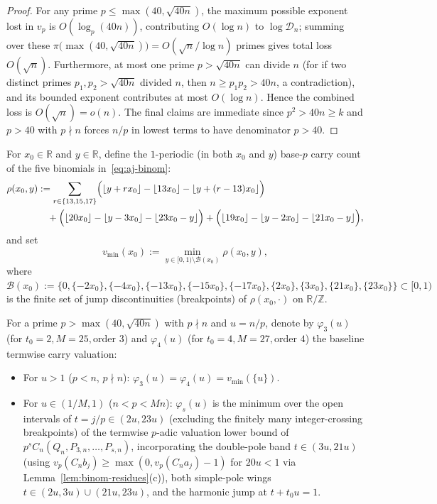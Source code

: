 \documentclass[11pt,reqno]{amsart}
\theoremstyle{definition}
\theoremstyle{remark}
\newcommand{\ZZ}{\mathbb{Z}}
\newcommand{\RR}{\mathbb{R}}
\begin{document}
\begin{proof}
For any prime $p \le \max(40, \sqrt{40n})$, the maximum possible exponent lost in $v_p$ is $O(\log_p(40n))$, contributing $O(\log n)$ to $\log\mathcal{D}_n$; summing over these $\pi\bigl(\max(40, \sqrt{40n})\bigr) = O(\sqrt{n}/\log n)$ primes gives total loss $O(\sqrt{n})$. Furthermore, at most one prime $p > \sqrt{40n}$ can divide $n$ (for if two distinct primes $p_1, p_2 > \sqrt{40n}$ divided $n$, then $n \ge p_1 p_2 > 40n$, a contradiction), and its bounded exponent contributes at most $O(\log n)$. Hence the combined loss is $O(\sqrt{n}) = o(n)$. The final claims are immediate since $p^2 > 40n \ge k$ and $p > 40$ with $p \nmid n$ forces $n/p$ in lowest terms to have denominator $p > 40$.
\end{proof}

For $x_0 \in \RR$ and $y \in \RR$, define the $1$-periodic (in both $x_0$ and $y$) base-$p$ carry count of the five binomials in~\eqref{eq:aj-binom}:
\begin{equation}
\label{eq:rho}
\begin{aligned}
  \rho(x_0, y) &:= \sum_{r \in \{13, 15, 17\}} \Bigl(\lfloor y + r x_0 \rfloor - \lfloor 13 x_0 \rfloor - \lfloor y + (r - 13) x_0 \rfloor\Bigr) \\
               &\quad + \Bigl(\lfloor 20 x_0 \rfloor - \lfloor y - 3 x_0 \rfloor - \lfloor 23 x_0 - y \rfloor\Bigr)
                      + \Bigl(\lfloor 19 x_0 \rfloor - \lfloor y - 2 x_0 \rfloor - \lfloor 21 x_0 - y \rfloor\Bigr),
\end{aligned}
\end{equation}
and set
\[
  v_{\min}(x_0) := \min_{y \in [0, 1) \setminus \mathcal{B}(x_0)} \rho(x_0, y),
\]
where $\mathcal{B}(x_0) := \{0, \{-2x_0\}, \{-4x_0\}, \{-13x_0\}, \{-15x_0\}, \{-17x_0\}, \{2x_0\}, \{3x_0\}, \{21x_0\}, \{23x_0\}\} \subset [0, 1)$ is the finite set of jump discontinuities (breakpoints) of $\rho(x_0, \cdot)$ on $\RR/\ZZ$.

For a prime $p > \max(40, \sqrt{40n})$ with $p \nmid n$ and $u = n/p$, denote by $\varphi_3(u)$ (for $t_0 = 2, M = 25, \text{order } 3$) and $\varphi_4(u)$ (for $t_0 = 4, M = 27, \text{order } 4$) the baseline termwise carry valuation:
\begin{itemize}
  \item For $u > 1$ ($p < n$, $p \nmid n$): $\varphi_3(u) = \varphi_4(u) = v_{\min}(\{u\})$.
  \item For $u \in (1/M, 1)$ ($n < p < Mn$): $\varphi_s(u)$ is the minimum over the open intervals of $t = j/p \in (2u, 23u)$ (excluding the finitely many integer-crossing breakpoints) of the termwise $p$-adic valuation lower bound of $p^s C_n(Q_n, P_{3,n}, \ldots, P_{s,n})$, incorporating the double-pole band $t \in (3u, 21u)$ (using $v_p(C_n b_j) \ge \max(0, v_p(C_n a_j) - 1)$ for $20u < 1$ via Lemma~\ref{lem:binom-residues}(c)), both simple-pole wings $t \in (2u, 3u) \cup (21u, 23u)$, and the harmonic jump at $t + t_0 u = 1$.
\end{itemize}
\end{document}
